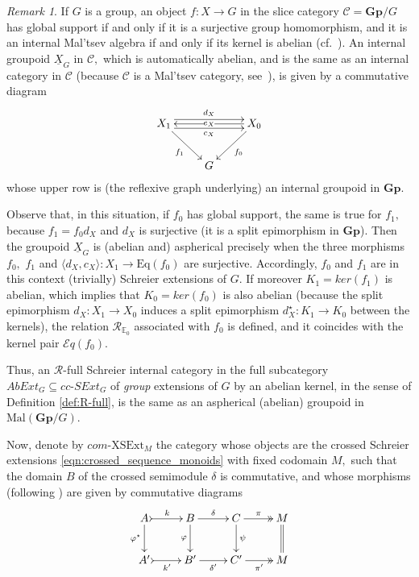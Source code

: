 \documentclass[a4paper]{amsart}
\theoremstyle{plain}
\theoremstyle{definition}
\theoremstyle{remark}
\newtheorem{remark}[subsection]{Remark}
\newcommand{\la}{\langle}
\newcommand{\ra}{\rangle}
\begin{document}
\begin{remark}
If $G$ is a group, an object  $f\colon X\longrightarrow G$ in the slice category $\mathcal{C}=\mathbf{Gp}/G$ has global support if and only if it is a surjective group homomorphism, and it is an internal Mal'tsev algebra if and only if its kernel is abelian (cf.~\cite{bourn-direction}). An internal groupoid $\underline{X}_G$ in $\mathcal{C},$ which is automatically abelian, and is the same as an internal category in $\mathcal{C}$ (because $\mathcal{C}$ is a Mal'tsev category, see~\cite{CPP}), is given by a commutative diagram
\begin{equation*}
\xymatrix{
{X_1} \ar[rd]_-{f_1} \ar@<.9ex>[rr]^-{d_X} \ar@<-.9ex>[rr]_-{c_X} &\ &{X_0} \ar[ld]^-{f_0} \ar[ll]|-{e_X} \\
&G
}
\end{equation*}
whose upper row is (the reflexive graph underlying) an internal groupoid in $\mathbf{Gp}.$

Observe that, in this situation, if $f_0$ has global support, the same is true for $f_1,$ because $f_1=f_0d_X$ and $d_X$ is surjective (it is a split epimorphism in $\mathbf{Gp}$). Then the groupoid $\underline{X}_G$ is (abelian and) aspherical precisely when the three morphisms $f_0,$ $f_1$ and $\la d_X,c_X\ra\colon X_1\longrightarrow\mathrm{Eq}(f_0)$ are surjective. Accordingly, $f_0$ and $f_1$ are in this context (trivially) Schreier extensions of $G.$ If moreover $K_1=ker(f_1)$ is abelian, which implies that $K_0=ker(f_0)$ is also abelian (because the split epimorphism $d_X\colon X_1\rightarrow X_0$ induces a split epimorphism ${d^{\star}_X}\colon K_1\rightarrow K_0$ between the kernels), the relation $\mathcal{R}_{\mathbb{E}_0}$ associated with $f_0$ is defined, and it coincides with the kernel pair $\mathcal{E}q(f_0).$

Thus, an $\mathcal{R}$-full Schreier internal category in the full subcategory $AbExt_G\subseteq cc\text{-}SExt_G$ of \emph{group} extensions of $G$ by an abelian kernel, in the sense of Definition \ref{def:R-full}, is the same as an aspherical (abelian) groupoid in $\mathrm{Mal}(\mathbf{Gp}/G).$
\end{remark}
Now, denote by $com\text{-}\mathrm{XSExt}_M$ the category whose objects are the crossed Schreier extensions \eqref{eqn:crossed_sequence_monoids} with fixed codomain $M,$ such that the domain $B$ of the crossed semimodule $\delta$ is commutative, and whose morphisms (following \cite{AMMPS}) are given by commutative diagrams
\begin{equation*}
\xymatrix{
A \ar@{>->}[r]^-k \ar[d]_-{\varphi^\star} &B \ar[r]^-{\delta} \ar[d]_-{\varphi} &C \ar@{->>}[r]^-{\pi} \ar[d]^-{\psi} &M\ar@{=}[d]  \\
{A'} \ar@{>->}[r]_-{k'} &{B'} \ar[r]_-{\delta'} &{C'} \ar@{->>}[r]_-{\pi'} &M
}
\end{equation*}
\end{document}
